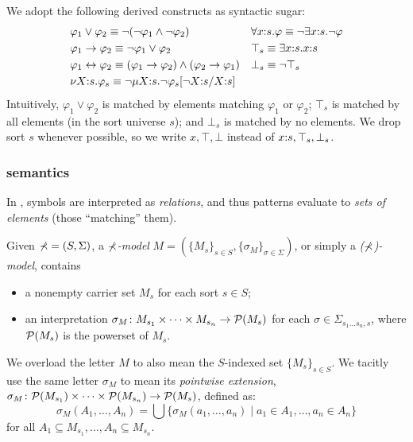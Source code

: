 \documentclass{almostllncs}
\begin{document}
We adopt the following derived constructs as syntactic sugar:
\begin{align*}
&\varphi_1 \vee \varphi_2 \equiv \neg (\neg \varphi_1 \wedge \neg \varphi_2)
&& \forall x \mathord{:} s \mathord{.} \varphi \equiv 
\neg \exists x \mathord{:} s \mathord{.} \neg \varphi
\\
& \varphi_1 \to \varphi_2 \equiv \neg \varphi_1 \vee \varphi_2
&& \top_s \equiv \exists x \mathord{:} s \mathord{.} x \mathord{:} s
\\
& \varphi_1 \leftrightarrow \varphi_2 \equiv (\varphi_1 \to \varphi_2)
\wedge (\varphi_2 \to \varphi_1)
&& \bot_s \equiv \neg \top_s
\\
& \nu X \mathord{:} s \mathord{.} \varphi_s \equiv \neg \mu X \mathord{:} s \mathord{.} \neg 
\varphi_s[\neg X \mathord{:} s / X \mathord{:} s]
\end{align*}
\noindent
Intuitively, $\varphi_1 \! \vee \! \varphi_2$ is matched by elements matching $\varphi_1$ or $\varphi_2$;
$\top_s$ is matched by all elements (in the sort universe $s$);
and $\bot_s$ is matched by no elements.
We drop sort $s$ whenever possible, so we write $x, \top, \bot$ instead of $x \mathord{:} s, \top_s, \bot_s$.

\subsubsection{\MmuL semantics}
In \mmul, symbols are interpreted as {\em relations}, and thus \mmul patterns
evaluate to {\em sets of elements} (those ``matching'' them).

\begin{definition} \label{def:Mmul-models}

Given $\mathbb{\Sigma} = (S,\Sigma)$, a \emph{\mmul $\mathbb{\Sigma}$-model} 
$M = (\{ M_s \}_{s \in S}, \{\sigma_M\}_{\sigma\in\Sigma})$,
or simply a \emph{($\mathbb{\Sigma}$)-model}, contains
\begin{itemize}	
\item a nonempty carrier set $M_s$ for each sort $s \in S$;
\item an interpretation $\sigma_M \colon M_{s_1} \times \dots \times M_{s_n} \to \mathcal{P}(M_s)$
	  for each $\sigma \in \Sigma_{s_1 \dots s_n , s}$, where $\mathcal{P}(M_s)$ is the powerset of $M_s$.
\end{itemize}

\end{definition}

\noindent
We overload the letter $M$ to also mean the $S$-indexed set $\{ M_s \}_{s \in S}$.
We tacitly
use the same letter $\sigma_M$ to mean its \emph{pointwise extension},
$\sigma_M \colon \mathcal{P}(M_{s_1}) \times \dots \times \mathcal{P}(M_{s_n}) \to
\mathcal{P}(M_s)$, defined as:
$$
\sigma_M(A_1,\dots,A_n) = {\bigcup} \{ \sigma_M (a_1,\dots,a_n) \mid
a_1 \in A_1,\dots, a_n \in A_n \}
$$
for all $A_1 \subseteq M_{s_1}, \dots, A_n \subseteq M_{s_n}$.
\end{document}
